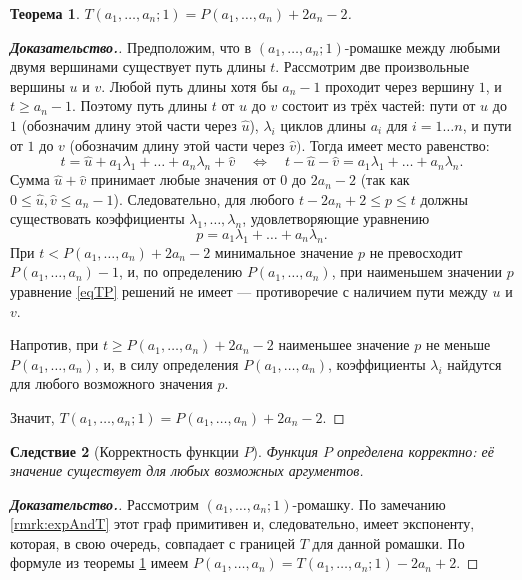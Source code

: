 \documentclass[12pt]{article}
\newtheorem{theorem}{Теорема}[section]
\newtheorem{corollary}[theorem]{Следствие}
\begin{document}
\begin{theorem}
\label{thTP}
$T(a_1, \dots, a_n; 1) = P(a_1, \dots, a_n) + 2a_n - 2$.
\end{theorem}
\begin{proof}[\textbf{Доказательство.}]
Предположим, что в $(a_1, \dots, a_n;1)$-ромашке между любыми двумя вершинами существует путь длины $t$. Рассмотрим две произвольные вершины $u$ и $v$. Любой путь длины хотя бы $a_n - 1$ проходит через вершину $1$, и $t \ge a_n - 1$. Поэтому путь длины $t$ от $u$ до $v$ состоит из трёх частей: пути от $u$ до $1$ (обозначим длину этой части через $\hat{u}$), $\lambda_i$ циклов длины $a_i$ для $i = 1\dots n$, и пути от $1$ до $v$ (обозначим длину этой части через $\hat{v})$. Тогда имеет место равенство:
\begin{equation*}
    t = \hat{u} + a_1 \lambda_1 + \dots + a_n \lambda_n + \hat{v} \quad \Longleftrightarrow \quad t - \hat{u} - \hat{v} = a_1 \lambda_1 + \dots + a_n \lambda_n.
\end{equation*}
Сумма $\hat{u} + \hat{v}$ принимает любые значения от $0$ до $2a_n - 2$ (так как $0 \le \hat{u}, \hat{v} \le a_n - 1$). Следовательно, для любого $t - 2a_n + 2 \le p \le t$ должны существовать коэффициенты $\lambda_1, \dots, \lambda_n$, удовлетворяющие уравнению 
\begin{equation}
\label{eqTP}
p = a_1 \lambda_1 + \dots + a_n \lambda_n.
\end{equation}
При $t < P(a_1, \dots, a_n) + 2a_n - 2$ минимальное значение $p$ не превосходит $P(a_1, \dots, a_n) - 1$, и, по определению $P(a_1, \dots, a_n)$, при наименьшем значении $p$ уравнение \ref{eqTP} решений не имеет --- противоречие с наличием пути между $u$ и $v$.

Напротив, при $t \ge P(a_1, \dots, a_n) + 2a_n - 2$ наименьшее значение $p$ не меньше $P(a_1, \dots, a_n)$, и, в силу определения $P(a_1, \dots, a_n)$, коэффициенты $\lambda_i$ найдутся для любого возможного значения $p$.

Значит, $T(a_1, \dots, a_n; 1) = P(a_1, \dots, a_n) + 2a_n - 2$.
\end{proof}

\begin{corollary}[Корректность функции $P$]
Функция $P$ определена корректно: её значение существует для любых возможных аргументов.
\end{corollary}
\begin{proof}[\textbf{Доказательство.}]
Рассмотрим $(a_1, \dots, a_n; 1)$-ромашку. По замечанию \ref{rmrk:expAndT} этот граф примитивен и, следовательно, имеет экспоненту, которая, в свою очередь, совпадает с границей $T$ для данной ромашки. По формуле из теоремы \ref{thTP} имеем $P(a_1, \dots, a_n) = T(a_1, \dots, a_n; 1) - 2a_n + 2$.
\end{proof}
\end{document}
